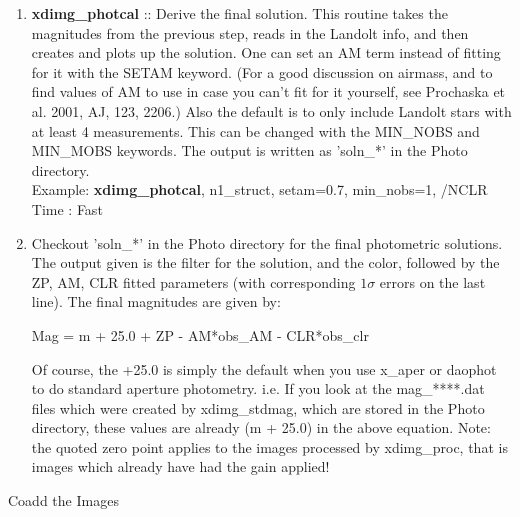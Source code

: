 \documentclass[11pt,letterpaper,dvips]{article}
\begin{document}
\begin{enumerate}
\begin{enumerate}
	  \item {\bf xdimg\_photcal} :: Derive the final solution.  This routine
		takes the magnitudes from the previous step, reads in the
		Landolt info, and then creates and plots up the solution.  
		One can set an AM
		term instead of fitting for it with the SETAM keyword.  (For a good discussion on airmass, and to find values of AM to use in case you can't fit for it yourself, see Prochaska et al. 2001, AJ, 123, 2206.)
		Also the default is to only include Landolt stars with at least
		4 measurements.  This can be changed with the MIN\_NOBS and
		MIN\_MOBS keywords.  The output is written as 'soln\_*' in
		the Photo directory.  \\
         	\quad Example: {\bf xdimg\_photcal}, n1\_struct, setam=0.7, min\_nobs=1, /NCLR \\
	        \quad Time   : Fast

	  \item Checkout 'soln\_*' in the Photo directory for the final 
		photometric solutions.  The output given is the filter
		for the solution, and the color, followed by the ZP, AM, CLR fitted
		parameters
		(with corresponding $1\sigma$ errors on the last line).  The final magnitudes are given by:\\
	
	 	\begin{center}
		Mag = m + 25.0 + ZP - AM*obs\_AM - CLR*obs\_clr \\
		\end{center}

		Of course, the +25.0 is simply the default when you use x\_aper or daophot to do standard aperture photometry.  i.e. If you look at the mag\_****.dat files which were created by xdimg\_stdmag, which are stored in the Photo directory, these values are already (m + 25.0) in the above equation.  Note: the quoted zero point applies to the images processed by xdimg\_proc, that is images which already have had the gain applied!

	\end{enumerate}

{\Large  \item Coadd the Images} \\

	\begin{enumerate}


\end{enumerate}
\end{enumerate}
\end{document}

